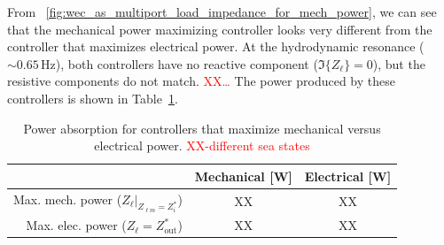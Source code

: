 \documentclass[lettersize,journal]{IEEEtran}
\newcommand{\rc}[1]{\textcolor{red}{#1}}
\begin{document}
\noindent{}From \figurename~\ref{fig:wec_as_multiport_load_impedance_for_mech_power}, we can see that the mechanical power maximizing controller looks very different from the controller that maximizes electrical power.
At the hydrodynamic resonance ($\sim 0.65$\,Hz), both controllers have no reactive component ($\Im \{ Z_\ell \}=0$), but the resistive components do not match.
\rc{XX\dots{}}
The power produced by these controllers is shown in Table~\ref{tab:mech_controller_vs_elec_controller_power}.

\begin{table}[tb]
        \caption{Power absorption for controllers that maximize mechanical versus electrical power. \rc{XX-different sea states}}
        \label{tab:mech_controller_vs_elec_controller_power}
        \centering

        \begin{tabular}{rcc}
        \toprule
         & Mechanical [W] & Electrical [W] \\ 
        \midrule
        Max. mech.  power ($Z_\ell \vert_{Z_{\ell m} = Z_i^*}$) & XX & XX \\
        Max. elec.  power ($Z_\ell = Z_{\mathrm{out}}^*$) & XX & XX \\
        \bottomrule
        \end{tabular}
\end{table}


\end{document}
